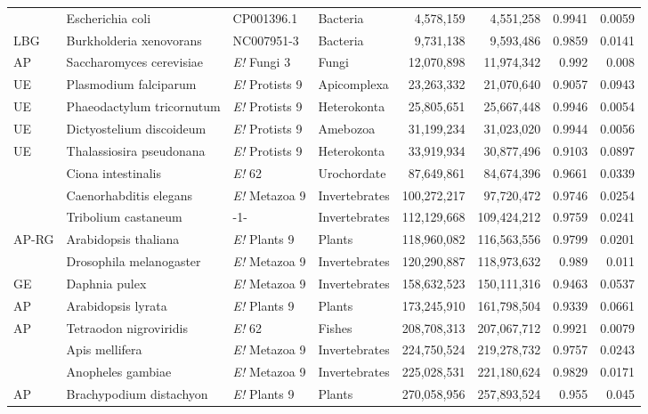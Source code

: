 \begin{table}[htbp]
{\begin{tabular}{ l l p{62pt} l r r r r }
 & Escherichia coli & CP001396.1 & Bacteria & 4,578,159 & 4,551,258 & 0.9941 & 0.0059 \\
LBG & Burkholderia xenovorans & NC007951-3 & Bacteria & 9,731,138 & 9,593,486 & 0.9859 & 0.0141 \\
AP & Saccharomyces cerevisiae & {\it E!} Fungi 3 & Fungi & 12,070,898 & 11,974,342 & 0.992 & 0.008 \\
UE & Plasmodium falciparum & {\it E!} Protists 9 & Apicomplexa & 23,263,332 & 21,070,640 & 0.9057 & 0.0943 \\
UE & Phaeodactylum tricornutum & {\it E!} Protists 9 & Heterokonta & 25,805,651 & 25,667,448 & 0.9946 & 0.0054 \\
UE & Dictyostelium discoideum & {\it E!} Protists 9 & Amebozoa & 31,199,234 & 31,023,020 & 0.9944 & 0.0056 \\
UE & Thalassiosira pseudonana & {\it E!} Protists 9 & Heterokonta & 33,919,934 & 30,877,496 & 0.9103 & 0.0897 \\
 & Ciona intestinalis & {\it E!} 62 & Urochordate & 87,649,861 & 84,674,396 & 0.9661 & 0.0339 \\
 & Caenorhabditis elegans & {\it E!} Metazoa 9 & Invertebrates & 100,272,217 & 97,720,472 & 0.9746 & 0.0254 \\
 & Tribolium castaneum & -1- & Invertebrates & 112,129,668 & 109,424,212 & 0.9759 & 0.0241 \\
AP-RG & Arabidopsis thaliana & {\it E!} Plants 9 & Plants & 118,960,082 & 116,563,556 & 0.9799 & 0.0201 \\
 & Drosophila melanogaster & {\it E!} Metazoa 9 & Invertebrates & 120,290,887 & 118,973,632 & 0.989 & 0.011 \\
GE & Daphnia pulex & {\it E!} Metazoa 9 & Invertebrates & 158,632,523 & 150,111,316 & 0.9463 & 0.0537 \\
AP & Arabidopsis lyrata & {\it E!} Plants 9 & Plants & 173,245,910 & 161,798,504 & 0.9339 & 0.0661 \\
AP & Tetraodon nigroviridis & {\it E!} 62 & Fishes & 208,708,313 & 207,067,712 & 0.9921 & 0.0079 \\
 & Apis mellifera & {\it E!} Metazoa 9 & Invertebrates & 224,750,524 & 219,278,732 & 0.9757 & 0.0243 \\
 & Anopheles gambiae & {\it E!} Metazoa 9 & Invertebrates & 225,028,531 & 221,180,624 & 0.9829 & 0.0171 \\
AP & Brachypodium distachyon & {\it E!} Plants 9 & Plants & 270,058,956 & 257,893,524 & 0.955 & 0.045 \\

\end{tabular}}
\end{table}
